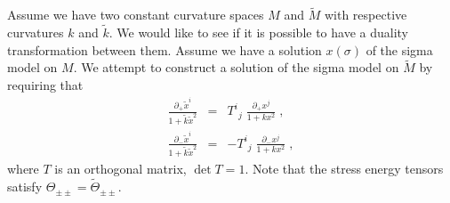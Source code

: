 \documentclass[a4paper,12pt]{article}
\newcommand{\Mtil}{\widetilde{M}}
\newcommand{\Tij}{T^{i}{}_{j}}
\newcommand{\dminus}{\partial_{-}}
\newcommand{\dplus}{\partial_{+}}
\newcommand{\ktil}{\tilde{k}}
\newcommand{\xtil}{\tilde{x}}
\begin{document}
Assume we have two constant curvature spaces $M$ and $\Mtil$ with
respective curvatures $k$ and $\ktil$.  We would like to see if it is
possible to have a duality transformation between them.  Assume we
have a solution $x(\sigma)$ of the sigma model on $M$.  We attempt to
construct a solution of the sigma model on $\Mtil$ by requiring that
\begin{eqnarray}
    \frac{\dplus \xtil^{i}}{1 + \ktil \xtil^{2}} & = & 
    	\Tij\; \frac{\dplus x^{j}}{1 + k x^{2}}\;,
    \label{eq:dualp}  \\
    \frac{\dminus \xtil^{i}}{1 + \ktil \xtil^{2}} & = & 
    	-\Tij\; \frac{\dminus x^{j}}{1 + k x^{2}}\;,
    \label{eq:dualm}
\end{eqnarray}
where $T$ is an orthogonal matrix, $\det T=1$.  Note that the stress
energy tensors satisfy $\Theta_{\pm\pm}=\widetilde{\Theta}_{\pm\pm}$. 
\end{document}
